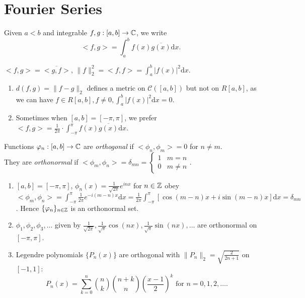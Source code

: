 \section{Fourier Series}
\begin{define}
	Given $a<b$ and integrable $f,g: [a,b]\to \mathbb{C}$, we write \[
		<f,g> = \int_{a}^{b}{f(x)\overline{g(x)}\mathrm{d}x}
		.\]
	\begin{remark}
		$<f,g>=\overline{<g,f>}$, $\|f\|_2^{2}= < f,f> = \int_{a}^{b}{\left|f(x)\right|^2\mathrm{d}x}$.
	\end{remark}
	\begin{note}
		\begin{enumerate}
			\item $d(f,g)= \|f-g\|_2$ defines a metric on $\mathscr{C}([a,b])$ but not on $R[a,b]$, as we can have $f \in R[a,b], f\neq 0, \int_{a}^{b}{\left|f(x)\right|^2\mathrm{d}x}=0$.
			\item Sometimes when $[a,b]= [-\pi,\pi]$, we prefer $<f ,g > = \frac{1}{2\pi} \cdot \int_{-\pi}^{\pi}{f(x) \overline{g(x)}\mathrm{d}x}$.
		\end{enumerate}
	\end{note}
\end{define}

\begin{define}
	Functions $\varphi_n:[a,b]\to \mathbb{C}$ are \textit{orthogonal} if $<\phi_n,\phi_m>=0$ for $n\neq m$.\\
	They are \textit{orthonormal} if $<\phi_m,\phi_n>=\delta_{mn}= \begin{cases}
			1 & m= n    \\
			0 & m\neq n
		\end{cases}$.
\end{define}

\begin{example}
	\begin{enumerate}
		\item $[a,b]=[-\pi,\pi]$, $\phi_n(x)=\frac{1}{\sqrt{2\pi}}e^{i n x}$ for $n \in \mathbb{Z}$ obey $<\phi_m, \phi_n> =\int_{-\pi}^{\pi}{\frac{1}{2\pi}e^{-i(m-n)x}\mathrm{d}x}=\frac{1}{2\pi}\int_{-\pi}^{\pi}{\left[\cos{(m-n)x}+i \sin{(m-n)x}\right] \mathrm{d}x}
			      =\delta_{mn}$. Hence $\{\varphi_n\}_{n \in \mathbb{Z}}$ is an orthonormal set.
		\item $\phi_{1},\phi_{2}, \phi_{3}, \ldots  $ given by $\frac{1}{\sqrt{2\pi}}, \frac{1}{\sqrt{\pi}} \cos{(nx)}, \frac{1}{\sqrt{\pi}} \sin{(nx)}, \ldots$ are orthonormal on $[-\pi,\pi]$.
		\item Legendre polynomials $\{P_n(x)\}$ are orthogonal with $\|P_n\|_{2}=\sqrt{\frac{2}{2n+1}}$ on $[-1,1]$:
		      \[
			      P_{n}(x)=\sum_{k=0}^{n}{\binom{n}{k}\binom{n+k}{n} {\left(\frac{x-1}{2}\right)}^{k}} \text{ for } n=0,1,2,\ldots
			      .\]
	\end{enumerate}
\end{example}


